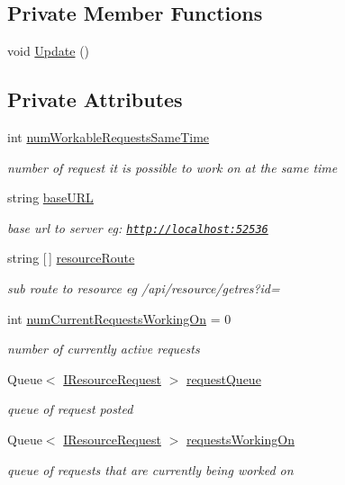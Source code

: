 \subsection*{Private Member Functions}
\begin{DoxyCompactItemize}
\item 
void \mbox{\hyperlink{class_resource_loader_a20a1036648a453863c96b51d33edfa11}{Update}} ()
\end{DoxyCompactItemize}
\subsection*{Private Attributes}
\begin{DoxyCompactItemize}
\item 
int \mbox{\hyperlink{class_resource_loader_ab0983780f3a6f7517a8377010dfd4fe7}{num\+Workable\+Requests\+Same\+Time}}
\begin{DoxyCompactList}\small\item\em number of request it is possible to work on at the same time \end{DoxyCompactList}\item 
string \mbox{\hyperlink{class_resource_loader_a63594097a2099f41637445a76f8df1a9}{base\+U\+RL}}
\begin{DoxyCompactList}\small\item\em base url to server eg\+: \href{http://localhost:52536}{\tt http\+://localhost\+:52536} \end{DoxyCompactList}\item 
string \mbox{[}$\,$\mbox{]} \mbox{\hyperlink{class_resource_loader_a16070d3fe56ca93ca9690f15d36df67b}{resource\+Route}}
\begin{DoxyCompactList}\small\item\em sub route to resource eg /api/resource/getres?id= \end{DoxyCompactList}\item 
int \mbox{\hyperlink{class_resource_loader_a3a96acf88c8727a7f76b56bbb483b706}{num\+Current\+Requests\+Working\+On}} = 0
\begin{DoxyCompactList}\small\item\em number of currently active requests \end{DoxyCompactList}\item 
Queue$<$ \mbox{\hyperlink{interface_i_resource_request}{I\+Resource\+Request}} $>$ \mbox{\hyperlink{class_resource_loader_af06b5459698c44c6acbb52c456fa2c71}{request\+Queue}}
\begin{DoxyCompactList}\small\item\em queue of request posted \end{DoxyCompactList}\item 
Queue$<$ \mbox{\hyperlink{interface_i_resource_request}{I\+Resource\+Request}} $>$ \mbox{\hyperlink{class_resource_loader_afbcaf8e71a04ea93dddd62f342b50bc8}{requests\+Working\+On}}
\begin{DoxyCompactList}\small\item\em queue of requests that are currently being worked on \end{DoxyCompactList}\end{DoxyCompactItemize}


